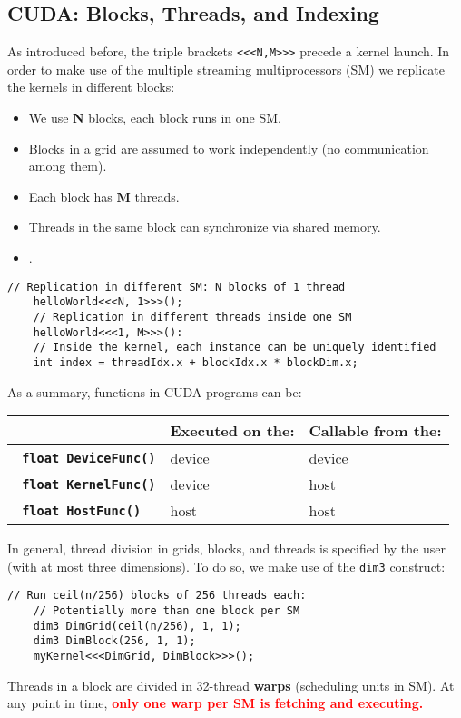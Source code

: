 \subsection{CUDA: Blocks, Threads, and Indexing}
As introduced before, the triple brackets \texttt{<<<N,M>>>} precede a kernel launch.
In order to make use of the multiple streaming multiprocessors (SM) we replicate the kernels in different blocks:
\begin{itemize}
    \item We use \textbf{N} blocks, each block runs in one SM.
    \item Blocks in a grid are assumed to work independently (no communication among them).
    \item Each block has \textbf{M} threads.
    \item Threads in the same block can synchronize via shared memory.
    \item \textbf{\color{red}{CUDA only allows for synchronization among threads in the same block.}}.
\end{itemize}
\begin{lstlisting}[style=cuda,caption={Example of a kernel definition and call.}]
    // Replication in different SM: N blocks of 1 thread
    helloWorld<<<N, 1>>>();
    // Replication in different threads inside one SM
    helloWorld<<<1, M>>>():
    // Inside the kernel, each instance can be uniquely identified
    int index = threadIdx.x + blockIdx.x * blockDim.x;
\end{lstlisting}
As a summary, functions in CUDA programs can be:
\begin{table}[h!]
    \centering
    \begin{tabular}{p{} p{} p{}}
        \hline
        & \textbf{Executed on the:} & \textbf{Callable from the:} \\[3pt] \hline \hline
        \textbf{\texttt{\color{blue}{\_\_device\_\_} \color{black}float DeviceFunc()}} & device & device \\[3pt]
        \textbf{\texttt{\color{blue}{\_\_global\_\_} \color{black}float KernelFunc()}} & device & host \\[3pt]
        \textbf{\texttt{\color{blue}{\_\_host\_\_} \color{black}float HostFunc()}} & host & host \\[3pt] \hline \hline
    \end{tabular}
\end{table}

In general, thread division in grids, blocks, and threads is specified by the user (with at most three dimensions).
To do so, we make use of the \texttt{dim3} construct:
\begin{lstlisting}[style=cuda,caption={Example of a kernel definition and call.}]
    // Run ceil(n/256) blocks of 256 threads each:
    // Potentially more than one block per SM
    dim3 DimGrid(ceil(n/256), 1, 1);
    dim3 DimBlock(256, 1, 1);
    myKernel<<<DimGrid, DimBlock>>>();
\end{lstlisting}
Threads in a block are divided in 32-thread \textbf{warps} (scheduling units in SM).
At any point in time, \textbf{\textcolor{red}{only one warp per SM is fetching and executing.}}

